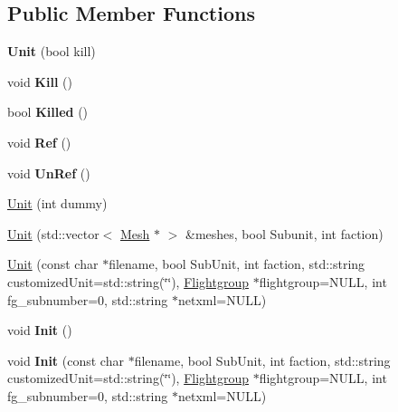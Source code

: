 \subsection*{Public Member Functions}
\begin{DoxyCompactItemize}
\item 
{\bfseries Unit} (bool kill)\hypertarget{classUnit_a68d3ababf869e1193f79769271aab237}{}\label{classUnit_a68d3ababf869e1193f79769271aab237}

\item 
void {\bfseries Kill} ()\hypertarget{classUnit_aa814fc5af8e029ffe97cd141e50bb08d}{}\label{classUnit_aa814fc5af8e029ffe97cd141e50bb08d}

\item 
bool {\bfseries Killed} ()\hypertarget{classUnit_a992b1175663968d64355551e111fa8f0}{}\label{classUnit_a992b1175663968d64355551e111fa8f0}

\item 
void {\bfseries Ref} ()\hypertarget{classUnit_a3231bf3f133744e0bb820804f5223451}{}\label{classUnit_a3231bf3f133744e0bb820804f5223451}

\item 
void {\bfseries Un\+Ref} ()\hypertarget{classUnit_a2d46a93ca4d6f78000ade6bea0bf02f8}{}\label{classUnit_a2d46a93ca4d6f78000ade6bea0bf02f8}

\item 
\hyperlink{classUnit_a5d2d1ebc882945cae3e81d2a7d44aacc}{Unit} (int dummy)
\item 
\hyperlink{classUnit_ac4a53fe36d9f4f2106f25a26f79e4898}{Unit} (std\+::vector$<$ \hyperlink{classMesh}{Mesh} $\ast$ $>$ \&meshes, bool Subunit, int faction)
\item 
\hyperlink{classUnit_a01d9c8985fdb16b02765a7374c5e8201}{Unit} (const char $\ast$filename, bool Sub\+Unit, int faction, std\+::string customized\+Unit=std\+::string(\char`\"{}\char`\"{}), \hyperlink{classFlightgroup}{Flightgroup} $\ast$flightgroup=N\+U\+LL, int fg\+\_\+subnumber=0, std\+::string $\ast$netxml=N\+U\+LL)
\item 
void {\bfseries Init} ()\hypertarget{classUnit_a3c7e50ae002e43acb867ddae032ac333}{}\label{classUnit_a3c7e50ae002e43acb867ddae032ac333}

\item 
void {\bfseries Init} (const char $\ast$filename, bool Sub\+Unit, int faction, std\+::string customized\+Unit=std\+::string(\char`\"{}\char`\"{}), \hyperlink{classFlightgroup}{Flightgroup} $\ast$flightgroup=N\+U\+LL, int fg\+\_\+subnumber=0, std\+::string $\ast$netxml=N\+U\+LL)\hypertarget{classUnit_a3ecef29e4ea305bbeab352cbdf339cd5}{}\label{classUnit_a3ecef29e4ea305bbeab352cbdf339cd5}


\end{DoxyCompactItemize}
